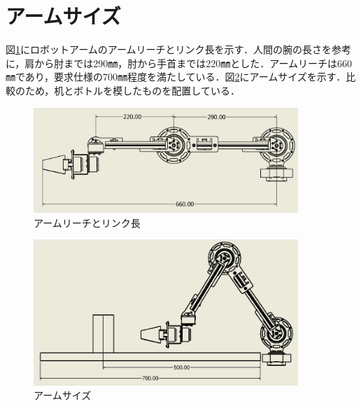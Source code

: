 \section{アームサイズ}
図\ref{fig:link_length}にロボットアームのアームリーチとリンク長を示す．人間の腕の長さを参考に，肩から肘までは290㎜，肘から手首までは220㎜とした．アームリーチは660㎜であり，要求仕様の700㎜程度を満たしている．図\ref{fig:arm_size}にアームサイズを示す．比較のため，机とボトルを模したものを配置している．
\begin{figure}[h]
  \centering
  \includegraphics[width=10cm]{images/link_length.png}
  \caption{アームリーチとリンク長}
  \label{fig:link_length}
\end{figure}
\begin{figure}[h]
  \centering
  \includegraphics[width=10cm]{images/hikaku.png}
  \caption{アームサイズ}
  \label{fig:arm_size}
\end{figure}

\newpage
